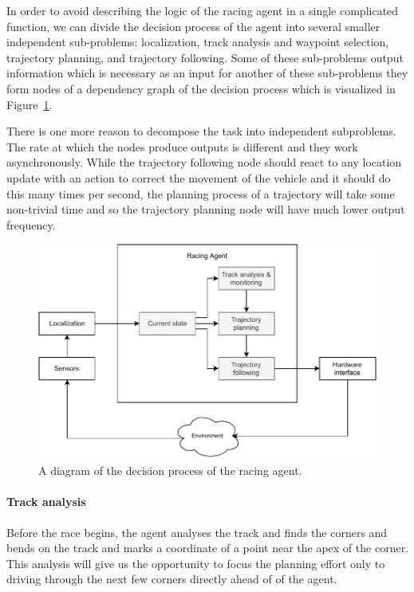In order to avoid describing the logic of the racing agent in a single complicated function, we can divide the decision process of the agent into several smaller independent sub-problems: localization, track analysis and waypoint selection, trajectory planning, and trajectory following. Some of these sub-problems output information which is necessary as an input for another of these sub-problems they form nodes of a dependency graph of the decision process which is visualized in Figure~\ref{fig:racing_agent_diagram}.

There is one more reason to decompose the task into independent subproblems. The rate at which the nodes produce outputs is different and they work asynchronously. While the trajectory following node should react to any location update with an action to correct the movement of the vehicle and it should do this many times per second, the planning process of a trajectory will take some non-trivial time and so the trajectory planning node will have much lower output frequency.

\begin{figure}[]\centering
\includegraphics[width=125mm]{../img/racing_agent_diagram.pdf}
\caption{A diagram of the decision process of the racing agent.}
\label{fig:racing_agent_diagram}
\end{figure}

\paragraph{Track analysis} Before the race begins, the agent analyses the track and finds the corners and bends on the track and marks a coordinate of a point near the apex of the corner. This analysis will give us the opportunity to focus the planning effort only to driving through the next few corners directly ahead of of the agent.


